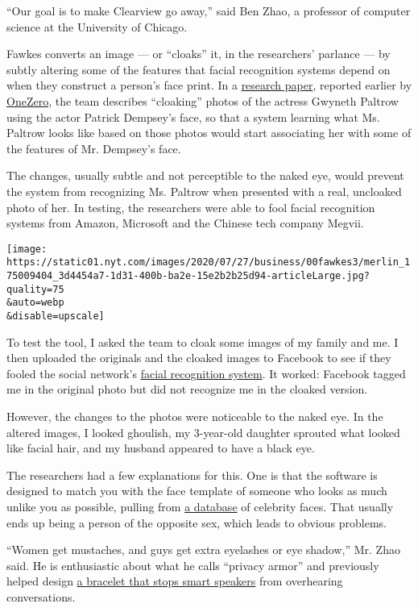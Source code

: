 ``Our goal is to make Clearview go away,'' said Ben Zhao, a professor of
computer science at the University of Chicago.

Fawkes converts an image --- or ``cloaks'' it, in the researchers'
parlance --- by subtly altering some of the features that facial
recognition systems depend on when they construct a person's face print.
In a \href{https://arxiv.org/pdf/2002.08327.pdf}{research paper},
reported earlier by
\href{https://onezero.medium.com/this-filter-makes-your-photos-invisible-to-facial-recognition-a26929b5ccf}{OneZero},
the team describes ``cloaking'' photos of the actress Gwyneth Paltrow
using the actor Patrick Dempsey's face, so that a system learning what
Ms. Paltrow looks like based on those photos would start associating her
with some of the features of Mr. Dempsey's face.

The changes, usually subtle and not perceptible to the naked eye, would
prevent the system from recognizing Ms. Paltrow when presented with a
real, uncloaked photo of her. In testing, the researchers were able to
fool facial recognition systems from Amazon, Microsoft and the Chinese
tech company Megvii.

\texttt{[image: https://static01.nyt.com/images/2020/07/27/business/00fawkes3/merlin\_175009404\_3d4454a7-1d31-400b-ba2e-15e2b2b25d94-articleLarge.jpg?quality=75\\\&auto=webp\\\&disable=upscale]}

To test the tool, I asked the team to cloak some images of my family and
me. I then uploaded the originals and the cloaked images to Facebook to
see if they fooled the social network's
\href{https://www.facebook.com/help/122175507864081}{facial recognition
system}. It worked: Facebook tagged me in the original photo but did not
recognize me in the cloaked version.

However, the changes to the photos were noticeable to the naked eye. In
the altered images, I looked ghoulish, my 3-year-old daughter sprouted
what looked like facial hair, and my husband appeared to have a black
eye.

The researchers had a few explanations for this. One is that the
software is designed to match you with the face template of someone who
looks as much unlike you as possible, pulling from
\href{http://www.robots.ox.ac.uk/~vgg/data/vgg_face2/}{a database} of
celebrity faces. That usually ends up being a person of the opposite
sex, which leads to obvious problems.

``Women get mustaches, and guys get extra eyelashes or eye shadow,'' Mr.
Zhao said. He is enthusiastic about what he calls ``privacy armor'' and
previously helped design
\href{https://www.nytimes.com/2020/02/14/technology/alexa-jamming-bracelet-privacy-armor.html}{a
bracelet that stops smart speakers} from overhearing conversations.

